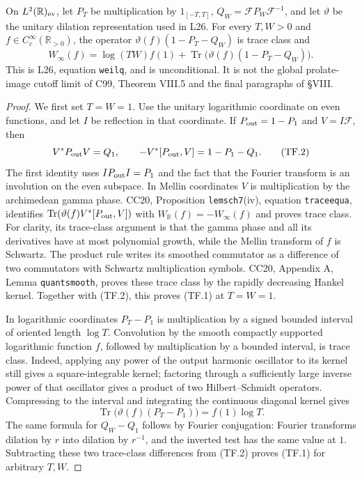 \begin{proposition}
\label{AC-T19}
On \(L^2(\mathbb R)_{\rm ev}\), let \(P_T\) be multiplication by
\(1_{[-T,T]}\), \(Q_W=\mathcal F P_W\mathcal F^{-1}\), and let
\(\vartheta\) be the unitary dilation representation used in L26.
For every \(T,W>0\) and \(f\in C_c^\infty(\mathbb R_{>0})\),
the operator
\(\vartheta(f)(1-P_T-Q_W)\) is trace class and
\[
 W_\infty(f)=\log(TW)f(1)
       +\operatorname{Tr}\bigl(\vartheta(f)(1-P_T-Q_W)\bigr).
 \tag{TF.1}
\]
This is L26, equation \texttt{weilq}, and is unconditional.
It is not the global prolate-image cutoff limit of C99,
Theorem VIII.5 and the final paragraphs of \S VIII.
\end{proposition}
\begin{proof}
We first set \(T=W=1\).
Use the unitary logarithmic coordinate on even functions,
and let \(I\) be reflection in that coordinate.
If \(P_{\rm out}=1-P_1\) and \(V=I\mathcal F\), then
\[
 V^*P_{\rm out}V=Q_1,\qquad
 -V^*[P_{\rm out},V]=1-P_1-Q_1.
 \tag{TF.2}
\]
The first identity uses \(IP_{\rm out}I=P_1\) and the fact that
the Fourier transform is an involution on the even subspace.
In Mellin coordinates \(V\) is multiplication by the
archimedean gamma phase.  CC20, Proposition \texttt{lemsch7}(iv),
equation \texttt{traceequa}, identifies
\(\operatorname{Tr}(\vartheta(f)V^*[P_{\rm out},V])\)
with \(W_{\mathbb R}(f)=-W_\infty(f)\) and proves trace class.
For clarity, its trace-class argument is that the gamma phase
and all its derivatives have at most polynomial growth, while
the Mellin transform of \(f\) is Schwartz.  The product rule
writes its smoothed commutator as a difference of two
commutators with Schwartz multiplication symbols.  CC20,
Appendix A, Lemma \texttt{quantsmooth}, proves these trace
class by the rapidly decreasing Hankel kernel.  Together
with (TF.2), this proves (TF.1) at \(T=W=1\).

In logarithmic coordinates \(P_T-P_1\) is multiplication by
a signed bounded interval of oriented length \(\log T\).
Convolution by the smooth compactly supported logarithmic
function \(f\), followed by multiplication by a bounded
interval, is trace class.  Indeed, applying any power of the
output harmonic oscillator to its kernel still gives a
square-integrable kernel; factoring through a sufficiently
large inverse power of that oscillator gives a product of
two Hilbert--Schmidt operators.  Compressing to the interval
and integrating the continuous diagonal kernel gives
\[
 \operatorname{Tr}\bigl(\vartheta(f)(P_T-P_1)\bigr)
     =f(1)\log T.
 \tag{TF.3}
\]
The same formula for \(Q_W-Q_1\) follows by Fourier conjugation:
Fourier transforms dilation by \(r\) into dilation by \(r^{-1}\),
and the inverted test has the same value at \(1\).
Subtracting these two trace-class differences from (TF.2)
proves (TF.1) for arbitrary \(T,W\).
\end{proof}

